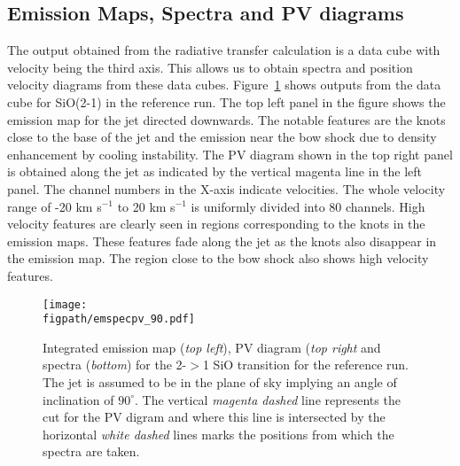 \documentclass[useAMS,usenatbib]{mn2e}
\newcommand{\figpath}{/Users/bhargavvaidya/MyProject/work/Leeds_Uni/SiOJets_New/PAPER/PFIGS/}
\begin{document}



\subsection{Emission Maps, Spectra and PV diagrams}
\label{ssec:emspecpv}
The output obtained from the radiative transfer calculation is a data
cube with velocity being the third axis. This allows us to obtain
spectra and position velocity diagrams from these data cubes. 
Figure~\ref{empvspec90} shows outputs from the data
cube for SiO(2-1) in the reference run. 
The top left panel in the figure shows the emission map for the jet
directed downwards. The notable features are the knots close to the
base of the jet and the emission near the bow shock due to density
enhancement by cooling instability. The PV diagram shown in the top
right panel is obtained along the jet as indicated by the vertical magenta
line in the left panel. The channel numbers in the X-axis indicate
velocities. The whole velocity range of -20 km s$^{-1}$ to 20 km
s$^{-1}$ is uniformly divided into 80 channels. High velocity features
are clearly seen in regions corresponding to the knots in the emission
maps. These features fade along the jet as the knots also disappear in
the emission map. The region close to the bow shock also shows high
velocity features.
%

\begin{figure}
 \texttt{[image: \\figpath/emspecpv\_90.pdf]}%
 \caption{Integrated emission map ({\it top left}), PV diagram ({\it top right}
   and spectra ({\it bottom}) for the
   2-$>$1 SiO transition for the reference run. 
   The jet is assumed to be in the plane of sky implying an angle of
   inclination of $90^{\circ}$. The vertical {\it magenta dashed} line represents the cut for the PV digram and where this line is intersected by the horizontal
 {\it white dashed} lines marks the positions from which the spectra are taken.} 
\label{empvspec90}
\end{figure}
\end{document}
